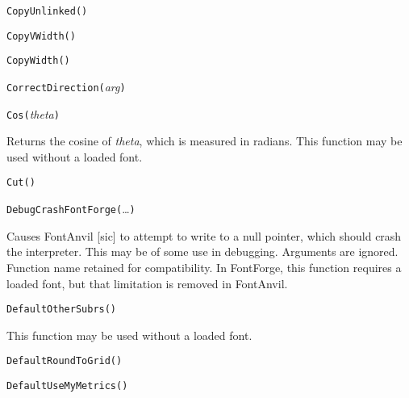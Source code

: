 \texttt{CopyUnlinked(}\texttt{)}



\texttt{CopyVWidth(}\texttt{)}



\texttt{CopyWidth(}\texttt{)}



\texttt{CorrectDirection(}\textit{arg}\texttt{)}



\texttt{Cos(}\textit{theta}\texttt{)}

Returns the cosine of \textit{theta}, which is measured in radians.
This function may be used without a loaded font.



\texttt{Cut(}\texttt{)}



\texttt{DebugCrashFontForge(}\ldots\texttt{)}

Causes FontAnvil [sic] to attempt to write to a null pointer, which should
crash the interpreter.  This may be of some use in debugging.  Arguments are
ignored.  Function name retained for compatibility.  In \FFdiff FontForge,
this function requires a loaded font, but that limitation is removed in
FontAnvil.



\texttt{DefaultOtherSubrs(}\texttt{)}

This function may be used without a loaded font.



\texttt{DefaultRoundToGrid(}\texttt{)}



\texttt{DefaultUseMyMetrics(}\texttt{)}

